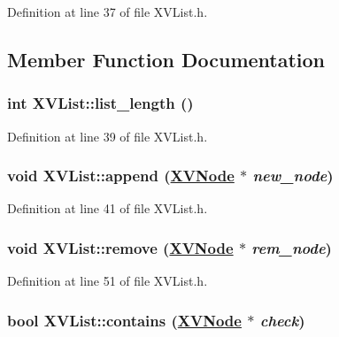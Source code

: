 Definition at line 37 of file XVList.h.

\subsection{Member Function Documentation}
\label{XVList_a1}
\hypertarget{class_XVList_a1}{
\subsubsection[list_length]{\setlength{\rightskip}{0pt plus 5cm}int XVList::list\_\-length ()}}




Definition at line 39 of file XVList.h.\label{XVList_a2}
\hypertarget{class_XVList_a2}{
\subsubsection[append]{\setlength{\rightskip}{0pt plus 5cm}void XVList::append (\hyperlink{class_XVNode}{XVNode} $\ast$ {\em new\_\-node})}}




Definition at line 41 of file XVList.h.\label{XVList_a3}
\hypertarget{class_XVList_a3}{
\subsubsection[remove]{\setlength{\rightskip}{0pt plus 5cm}void XVList::remove (\hyperlink{class_XVNode}{XVNode} $\ast$ {\em rem\_\-node})}}




Definition at line 51 of file XVList.h.\label{XVList_a4}
\hypertarget{class_XVList_a4}{
\subsubsection[contains]{\setlength{\rightskip}{0pt plus 5cm}bool XVList::contains (\hyperlink{class_XVNode}{XVNode} $\ast$ {\em check})}}




